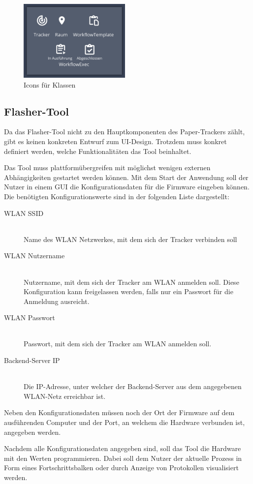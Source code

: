 \begin{figure}[h!tbp]
	\includegraphics[height=150px]{images/ui-prototype/class-icons.png}
	\centering
	\caption{Icons für Klassen}
	\label{fig:ui-icons}
\end{figure}

\subsection{Flasher-Tool}
Da das Flasher-Tool nicht zu den Hauptkomponenten des Paper-Trackers zählt, gibt es keinen konkreten Entwurf zum \gls{UI}-Design.
Trotzdem muss konkret definiert werden, welche Funktionalitäten das Tool beinhaltet.

Das Tool muss plattformübergreifen mit möglichst wenigen externen Abhängigkeiten gestartet werden können.
Mit dem Start der Anwendung soll der Nutzer in einem \gls{GUI} die Konfigurationsdaten für die Firmware eingeben können.
Die benötigten Konfigurationswerte sind in der folgenden Liste dargestellt:

\begin{description}
	\item[\gls{WLAN} \gls{SSID}] \hfill \\
		Name des \gls{WLAN} Netzwerkes, mit dem sich der Tracker verbinden soll 
	\item[\gls{WLAN} Nutzername] \hfill \\
		Nutzername, mit dem sich der Tracker am \gls{WLAN} anmelden soll. Diese Konfiguration kann freigelassen werden, falls nur ein Passwort für die Anmeldung ausreicht. 
	\item[\gls{WLAN} Passwort] \hfill \\
		Passwort, mit dem sich der Tracker am \gls{WLAN} anmelden soll. 
	\item[Backend-Server \gls{IP}] \hfill \\
		Die IP-Adresse, unter welcher der Backend-Server aus dem angegebenen \gls{WLAN}-Netz erreichbar ist. 
\end{description}

Neben den Konfigurationsdaten müssen noch der Ort der Firmware auf dem ausführenden Computer und der Port, an welchem die Hardware verbunden ist, angegeben werden.

Nachdem alle Konfigurationsdaten angegeben sind, soll das Tool die Hardware mit den Werten programmieren.
Dabei soll dem Nutzer der aktuelle Prozess in Form eines Fortschrittsbalken oder durch Anzeige von Protokollen visualisiert werden.